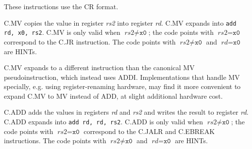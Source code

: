 These instructions use the CR format.

C.MV copies the value in register {\em rs2} into register {\em rd}.  C.MV
expands into {\tt add rd, x0, rs2}.
C.MV is only valid when $\textit{rs2}{\neq}\texttt{x0}$; the code points
with $\textit{rs2}{=}\texttt{x0}$ correspond to the C.JR instruction.
The code points with $\textit{rs2}{\neq}\texttt{x0}$ and
$\textit{rd}{=}\texttt{x0}$ are HINTs.

\begin{commentary}
C.MV expands to a different instruction than the canonical MV
pseudoinstruction, which instead uses ADDI. Implementations that handle MV
specially, e.g. using register-renaming hardware, may find it more convenient
to expand C.MV to MV instead of ADD, at slight additional hardware cost.
\end{commentary}

C.ADD adds the values in registers {\em rd} and {\em rs2} and writes the
result to register {\em rd}.  C.ADD expands into {\tt add rd, rd, rs2}.
C.ADD is only valid when $\textit{rs2}{\neq}\texttt{x0}$; the code points
with $\textit{rs2}{=}\texttt{x0}$ correspond to the C.JALR and C.EBREAK instructions.
The code points with $\textit{rs2}{\neq}\texttt{x0}$ and
$\textit{rd}{=}\texttt{x0}$ are HINTs.

